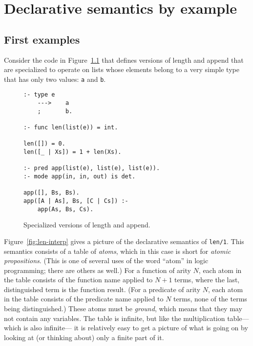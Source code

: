 \chapter{Declarative semantics by example}
\label{sec:by-example}

\section{First examples}
\label{sec:first-examples}

Consider the code in Figure~\ref{fig:len-app}
that defines versions of length and append
that are specialized to operate on lists
whose elements belong to a very simple type
that has only two values: \verb#a# and \verb#b#.

\begin{figure}[htb]
\begin{verbatim}
:- type e
    --->    a
    ;       b.

:- func len(list(e)) = int.

len([]) = 0.
len([_ | Xs]) = 1 + len(Xs).

:- pred app(list(e), list(e), list(e)).
:- mode app(in, in, out) is det.

app([], Bs, Bs).
app([A | As], Bs, [C | Cs]) :-
    app(As, Bs, Cs).
\end{verbatim}
\caption{Specialized versions of length and append.\label{fig:len-app}}
\end{figure}

Figure~\ref{fig:len-interp} gives a picture
of the declarative semantics of \texttt{len/1}.
This semantics consists of a table of \emph{atoms},
which in this case is short for \emph{atomic propositions}.
(This is one of several uses of the word ``atom'' in logic programming;
there are others as well.)
For a function of arity $N$, each atom in the table
consists of the function name applied to $N + 1$ terms,
where the last, distinguished term is the function result.
(For a predicate of arity $N$, each atom in the table
consists of the predicate name applied to $N$ terms,
none of the terms being distinguished.)
These atoms must be \emph{ground},
which means that they may not contain any variables.
The table is infinite,
but like the multiplication table---which is also infinite---%
it is relatively easy to get a picture of what is going on
by looking at (or thinking about) only a finite part of it.

